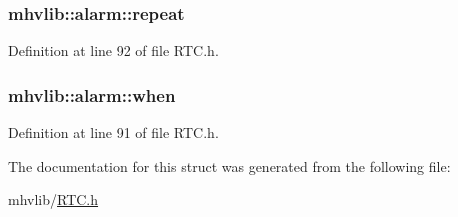 \hypertarget{structmhvlib_1_1alarm_af6b4badb6e8465e58cc9776f89e80482}{
\subsubsection[{repeat}]{ mhvlib\-::alarm\-::repeat}}\label{structmhvlib_1_1alarm_af6b4badb6e8465e58cc9776f89e80482}


Definition at line 92 of file R\-T\-C.\-h.

\hypertarget{structmhvlib_1_1alarm_a0bb8fc4ccaa59eb1135cf899c270b358}{
\subsubsection[{when}]{ mhvlib\-::alarm\-::when}}\label{structmhvlib_1_1alarm_a0bb8fc4ccaa59eb1135cf899c270b358}


Definition at line 91 of file R\-T\-C.\-h.



The documentation for this struct was generated from the following file\-:\begin{DoxyCompactItemize}
\item 
mhvlib/\hyperlink{_r_t_c_8h}{R\-T\-C.\-h}\end{DoxyCompactItemize}

